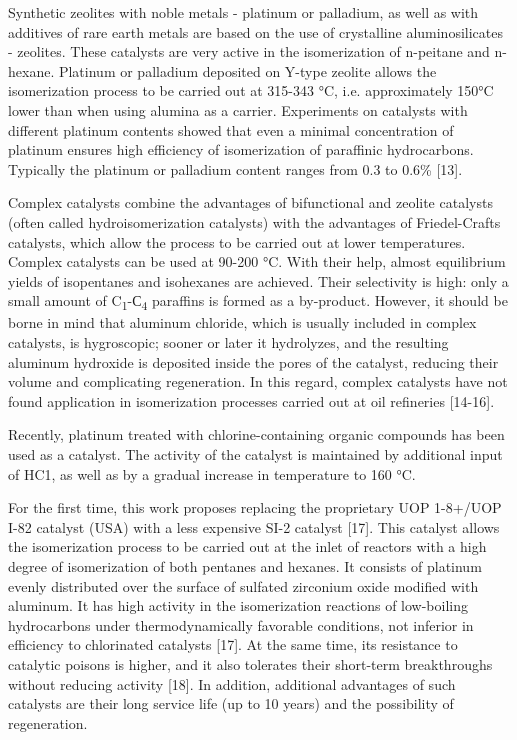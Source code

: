 Synthetic zeolites with noble metals - platinum or palladium, as well as
with additives of rare earth metals are based on the use of crystalline
aluminosilicates - zeolites. These catalysts are very active in the
isomerization of n-peitane and n-hexane. Platinum or palladium deposited
on Y-type zeolite allows the isomerization process to be carried out at
315-343 °C, i.e. approximately 150°C lower than when using alumina as a
carrier. Experiments on catalysts with different platinum contents
showed that even a minimal concentration of platinum ensures high
efficiency of isomerization of paraffinic hydrocarbons. Typically the
platinum or palladium content ranges from 0.3 to 0.6\% {[}13{]}.

Complex catalysts combine the advantages of bifunctional and zeolite
catalysts (often called hydroisomerization catalysts) with the
advantages of Friedel-Crafts catalysts, which allow the process to be
carried out at lower temperatures. Complex catalysts can be used at
90-200 °C. With their help, almost equilibrium yields of isopentanes and
isohexanes are achieved. Their selectivity is high: only a small amount
of C\textsubscript{1}-С\textsubscript{4} paraffins is formed as a
by-product. However, it should be borne in mind that aluminum chloride,
which is usually included in complex catalysts, is hygroscopic; sooner
or later it hydrolyzes, and the resulting aluminum hydroxide is
deposited inside the pores of the catalyst, reducing their volume and
complicating regeneration. In this regard, complex catalysts have not
found application in isomerization processes carried out at oil
refineries {[}14-16{]}.

Recently, platinum treated with chlorine-containing organic compounds
has been used as a catalyst. The activity of the catalyst is maintained
by additional input of HC1, as well as by a gradual increase in
temperature to 160 °C.

For the first time, this work proposes replacing the proprietary UOP
1-8+/UOP I-82 catalyst (USA) with a less expensive SI-2 catalyst
{[}17{]}. This catalyst allows the isomerization process to be carried
out at the inlet of reactors with a high degree of isomerization of both
pentanes and hexanes. It consists of platinum evenly distributed over
the surface of sulfated zirconium oxide modified with aluminum. It has
high activity in the isomerization reactions of low-boiling hydrocarbons
under thermodynamically favorable conditions, not inferior in efficiency
to chlorinated catalysts {[}17{]}. At the same time, its resistance to
catalytic poisons is higher, and it also tolerates their short-term
breakthroughs without reducing activity {[}18{]}. In addition,
additional advantages of such catalysts are their long service life (up
to 10 years) and the possibility of regeneration.

